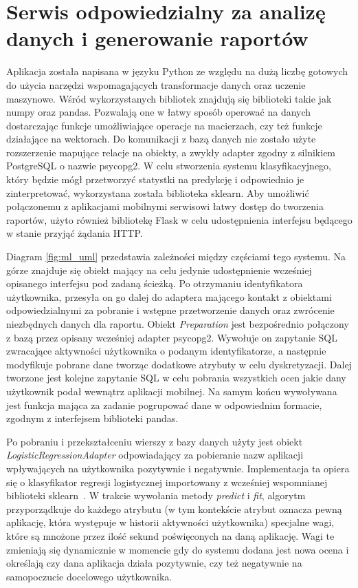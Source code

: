 \documentclass[a4paper,twoside,12pt]{book}
\begin{document}
\section{Serwis odpowiedzialny za analizę danych i generowanie raportów}
\label{python}
Aplikacja została napisana w języku Python ze względu na dużą liczbę gotowych do użycia narzędzi wspomagających transformacje danych oraz uczenie maszynowe. Wśród wykorzystanych bibliotek znajdują się biblioteki takie jak numpy oraz pandas. Pozwalają one w łatwy sposób operować na danych dostarczając funkcje umożliwiające operacje na macierzach, czy też funkcje działające na wektorach.
Do komunikacji z bazą danych nie zostało użyte rozszerzenie mapujące relacje na obiekty, a zwykły adapter zgodny z silnikiem PostgreSQL o nazwie psycopg2. W celu stworzenia systemu klasyfikacyjnego, który będzie mógł przetworzyć statystki na predykcję i odpowiednio je zinterpretować, wykorzystana została biblioteka sklearn. Aby umożliwić połączonemu z aplikacjami mobilnymi serwisowi łatwy dostęp do tworzenia raportów, użyto również bibliotekę Flask w celu udostępnienia interfejsu będącego w stanie przyjąć żądania HTTP. 

Diagram \ref{fig:ml_uml} przedstawia zależności między częściami tego systemu. Na górze znajduje się obiekt mający na celu jedynie udostępnienie wcześniej opisanego interfejsu pod zadaną ścieżką. Po otrzymaniu identyfikatora użytkownika, przesyła on go dalej do adaptera mającego kontakt z obiektami odpowiedzialnymi za pobranie i wstępne przetworzenie danych oraz zwrócenie niezbędnych danych dla raportu. Obiekt \textit{Preparation} jest bezpośrednio połączony z bazą przez opisany wcześniej adapter psycopg2. Wywołuje on zapytanie SQL zwracające aktywności użytkownika o podanym identyfikatorze, a następnie modyfikuje pobrane dane tworząc dodatkowe atrybuty w celu dyskretyzacji. Dalej tworzone jest kolejne zapytanie SQL w celu pobrania wszystkich ocen jakie dany użytkownik podał wewnątrz aplikacji mobilnej. Na samym końcu wywoływana jest funkcja mająca za zadanie pogrupować dane w odpowiednim formacie, zgodnym z interfejsem biblioteki pandas. 

Po pobraniu i przekształceniu wierszy z bazy danych użyty jest obiekt \textit{LogisticRegressionAdapter} odpowiadający za pobieranie nazw aplikacji wpływających na użytkownika pozytywnie i negatywnie. Implementacja ta opiera się o klasyfikator regresji logistycznej importowany z wcześniej wspomnianej biblioteki sklearn~\cite{logistic_regression}. W trakcie wywołania metody \textit{predict} i \textit{fit}, algorytm przyporządkuje do każdego atrybutu (w tym kontekście atrybut oznacza pewną aplikację, która występuje w historii aktywności użytkownika) specjalne wagi, które są mnożone przez ilość sekund poświęconych na daną aplikację. Wagi te zmieniają się dynamicznie w momencie gdy do systemu dodana jest nowa ocena i określają czy dana aplikacja działa pozytywnie, czy też negatywnie na samopoczucie docelowego użytkownika.
\end{document}
